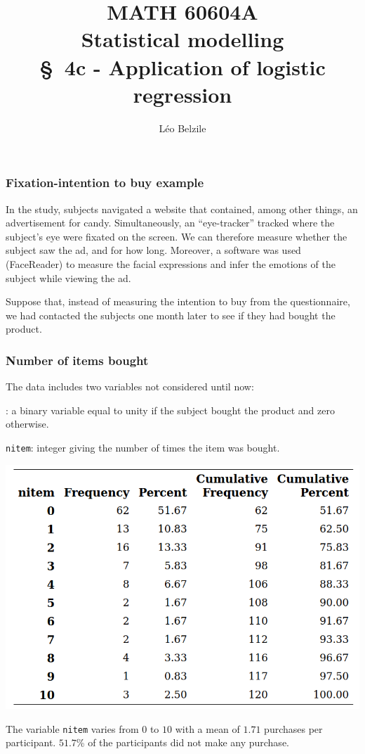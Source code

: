\documentclass{beamer}
\title[\color{white}{MATH 60604A \S~4c - Application of logistic regression}]{\texorpdfstring{MATH 60604A \\Statistical modelling \\ \S~4c - Application of logistic regression}{MATH 60604A \\Statistical modelling \\ \S~4c - Application of logistic regression}}
\author{Léo Belzile}
\institute{HEC Montréal\\
Department of Decision Sciences}
\date{}
\begin{document}
\frame{\titlepage}


\begin{frame}[fragile]
\frametitle{Fixation-intention to buy example}

 In the study, subjects navigated a website that contained, among other things, an advertisement for candy. Simultaneously, an ``eye-tracker'' tracked where the subject's eye were fixated on the screen. We can therefore measure whether the subject saw the ad, and for how long. Moreover, a software was used (FaceReader) to measure the facial expressions and infer the emotions of the subject while viewing the ad.
\vp


Suppose that, instead of measuring the intention to buy from the questionnaire, \alert{we had contacted the subjects one month later to see if they had bought the product}.
\end{frame}
\begin{frame}
\frametitle{Number of items bought}
The data includes two variables not considered until now:

\bi\item {}: a binary variable equal to unity if the subject bought the product and zero otherwise.
\item \texttt{nitem}: integer giving the number of times the item was bought.
\ei
\begin{center}
\includegraphics[width = 0.6\linewidth]{img/c4/slides8-e2}
\end{center}
The variable \texttt{nitem} varies from $0$ to $10$ with a mean of $1.71$ purchases per participant. $51.7$\% of the participants did not make any purchase.
\end{frame}
\end{document}
